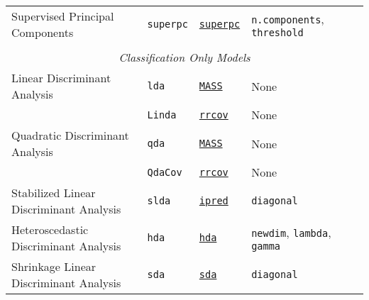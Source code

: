 \documentclass[12pt]{article}
\begin{document}
\begin{landscape}
\begin{longtable}{lllll}
      Supervised Principal Components&
         \texttt{superpc}  &
         {\tt \href{http://cran.r-project.org/web/packages/superpc/index.html}{superpc}} &
         \texttt{n.components}, \texttt{threshold} & \\
            
\\             
\multicolumn{5}{c}{{{\em Classification Only Models}}} \\ 

\rowcolor[rgb]{.95, .95, .95}         
      Linear Discriminant Analysis &
         \texttt{lda} & 
             {\tt \href{http://cran.r-project.org/web/packages/MASS/index.html}{MASS}}       &          
            None & \\
\rowcolor[rgb]{.95, .95, .95}                     
          &
         \texttt{Linda} & 
              {\tt \href{http://cran.r-project.org/web/packages/rrcov/index.html}{rrcov}}       &          
            None & \\
                        
            
      Quadratic Discriminant Analysis &
         \texttt{qda} & 
             {\tt \href{http://cran.r-project.org/web/packages/MASS/index.html}{MASS}}         &          
            None & \\ 
            
      &   \texttt{QdaCov} & 
             {\tt \href{http://cran.r-project.org/web/packages/rrcov/index.html}{rrcov}}        &          
            None & \\            
            
\rowcolor[rgb]{.95, .95, .95}                     
      Stabilized Linear Discriminant Analysis&
         \texttt{slda} & 
              {\tt \href{http://cran.r-project.org/web/packages/ipred/index.html}{ipred}}        &          
            \texttt{diagonal} & \\  
      
      Heteroscedastic Discriminant Analysis&
         \texttt{hda} & 
              {\tt \href{http://cran.r-project.org/web/packages/hda/index.html}{hda}}      &          
            \texttt{newdim}, \texttt{lambda}, \texttt{gamma} & \\  
            
\rowcolor[rgb]{.95, .95, .95}                     
      Shrinkage Linear Discriminant Analysis &
         \texttt{sda} & 
              {\tt \href{http://cran.r-project.org/web/packages/sda/index.html}{sda}}      &          
            \texttt{diagonal} & \\  
      

\end{longtable}
\end{landscape}
\end{document}
